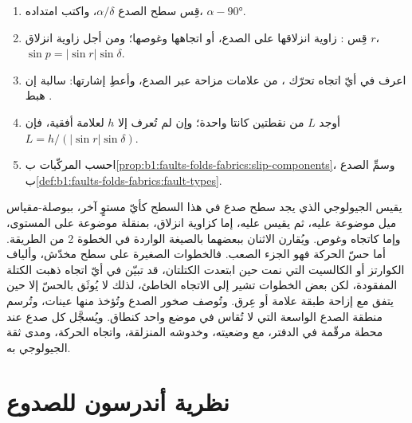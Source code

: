 \begin{method}\label{met:b1:faults-folds-fabrics:slip}
\begin{enumerate}
  \item قِس  سطح الصدع $\alpha/\delta$، واكتب امتداده، $\alpha - \ang{90}$.
  \item قِس : زاوية انزلاقها على الصدع، أو اتجاهها وغوصها؛ ومن أجل زاوية انزلاق $r$، $\sin p = |\sin r|\sin\delta$.
  \item اعرف في أيّ اتجاه تحرّك ، من علامات مزاحة عبر الصدع، وأعطِ  إشارتها: سالبة إن هبط .
  \item أوجد  $L$ من نقطتين كانتا واحدة؛ وإن لم تُعرف إلا  $h$ لعلامة أفقية، فإن $L = h/(|\sin r|\sin\delta)$.
  \item احسب المركّبات ب\cref{prop:b1:faults-folds-fabrics:slip-components}، وسمِّ الصدع ب\cref{def:b1:faults-folds-fabrics:fault-types}.
\end{enumerate}
\end{method}

\begin{inthefield}
يقيس الجيولوجي الذي يجد سطح صدع في  هذا السطح كأيّ مستوٍ آخر، ببوصلة-مقياس ميل موضوعة عليه، ثم يقيس  عليه، إما كزاوية انزلاق، بمنقلة موضوعة على المستوى، وإما كاتجاه وغوص. ويُقارن الاثنان ببعضهما بالصيغة الواردة في الخطوة 2 من الطريقة. أما حسّ الحركة فهو الجزء الصعب. فالخطوات الصغيرة على سطح مخدّش، وألياف الكوارتز أو الكالسيت التي نمت حين ابتعدت الكتلتان، قد تبيّن في أيّ اتجاه ذهبت الكتلة المفقودة، لكن بعض الخطوات تشير إلى الاتجاه الخاطئ، لذلك لا يُوثَق بالحسّ إلا حين يتفق مع إزاحة طبقة علامة أو عِرق. وتُوصف صخور الصدع وتُؤخذ منها عينات، وتُرسم منطقة الصدع الواسعة التي لا تُقاس في موضع واحد كنطاق. ويُسجَّل كل صدع عند محطة مرقّمة في الدفتر، مع وضعيته، وخدوشه المنزلقة، واتجاه الحركة، ومدى ثقة الجيولوجي به.
\end{inthefield}

\section{نظرية أندرسون للصدوع}\label{sec:b1:faults-folds-fabrics:anderson}

